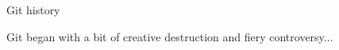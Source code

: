 \documentclass[11pt,professionalfonts]{beamer}
\begin{document}
\begin{frame}{Git history}%

Git began with a bit of creative destruction and fiery controversy...


\begin{columns}

\begin{column}[t]{0.5\textwidth}
\end{column}



\end{columns}
\end{frame}
\end{document}
